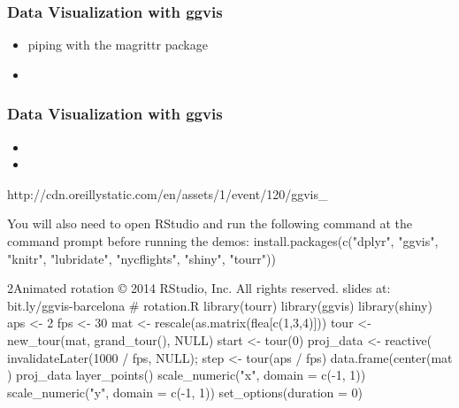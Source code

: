 

\begin{frame} 
\frametitle{ Data Visualization with ggvis}
\begin{itemize}

\item piping with the magrittr package

\item

\end{itemize}

\end{frame}


\begin{frame} 

\frametitle{ Data Visualization with ggvis}
\begin{itemize}

\item

\item

\end{itemize}

\end{frame}

http://cdn.oreillystatic.com/en/assets/1/event/120/ggvis_%

You will also need to open RStudio and run the following command at the
command prompt before running the demos:
install.packages(c("dplyr", "ggvis", "knitr",
 "lubridate", "nycflights", "shiny", "tourr"))


2Animated rotation
© 2014 RStudio, Inc. All rights reserved.
slides at: bit.ly/ggvis-barcelona
# rotation.R
library(tourr)
library(ggvis)
library(shiny)
aps <- 2
fps <- 30
mat <- rescale(as.matrix(flea[c(1,3,4)]))
tour <- new_tour(mat, grand_tour(), NULL)
start <- tour(0)
proj_data <- reactive({
 invalidateLater(1000 / fps, NULL);
 step <- tour(aps / fps)
 data.frame(center(mat %
})
proj_data %
 layer_points() %
 scale_numeric("x", domain = c(-1, 1)) %
 scale_numeric("y", domain = c(-1, 1)) %
 set_options(duration = 0)



